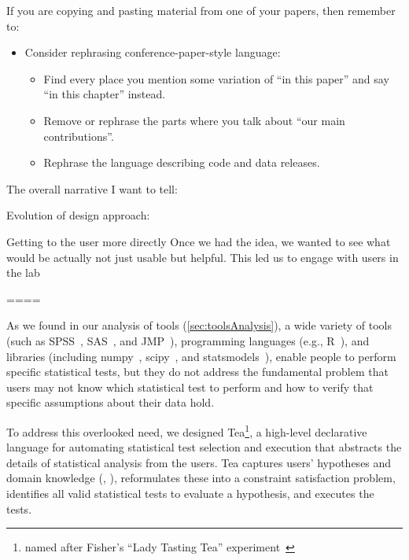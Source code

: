 If you are copying and pasting material from one of your papers, then remember to:
\begin{itemize}
    \item Consider rephrasing conference-paper-style language:
    \begin{itemize}
        \item Find every place you mention some variation of ``in this paper'' and say ``in this chapter'' instead.
        \item Remove or rephrase the parts where you talk about ``our main contributions''.
        \item Rephrase the language describing code and data releases.
    \end{itemize}
\end{itemize}

The overall narrative I want to tell: 

Evolution of design approach: 

Getting to the user more directly Once we had the
idea, we wanted to see what would be actually not just usable but helpful. This
led us to engage with users in the lab

====

As we found in our analysis of tools (\autoref{sec:toolsAnalysis}), a wide
variety of tools (such as SPSS~\cite{wiki:spss}, SAS~\cite{wiki:sas}, and
JMP~\cite{wiki:jmp}), programming languages (e.g., R~\cite{wiki:r-language}),
and libraries (including numpy~\cite{oliphant2006numpy}, scipy~\cite{scipy}, and
statsmodels~\cite{statsmodelsPaper}), enable people to perform specific
statistical tests, but they do not address the fundamental problem that users
may not know which statistical test to perform and how to verify that specific
assumptions about their data hold. 

To address this overlooked need, we designed Tea\footnote{named after Fisher's
``Lady Tasting Tea'' experiment~\cite{fisher1937design}}, a high-level
declarative language for automating statistical test selection and execution
that abstracts the details of statistical analysis from the users. Tea captures
users' hypotheses and domain knowledge (\higherLevel, \connectConceptualStats),
reformulates these into a constraint satisfaction problem, identifies all valid
statistical tests to evaluate a hypothesis, and executes the tests. 

